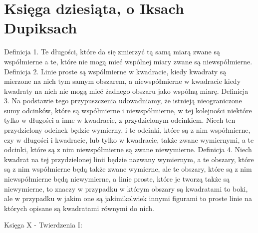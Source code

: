 \section{Księga dziesiąta, o Iksach Dupiksach}

    Definicja 1.
        Te długości, które da się zmierzyć tą samą miarą zwane są współmierne a te, które nie mogą mieć wspólnej miary zwane są niewspółmierne.
    Definicja 2.
        Linie proste są współmierne w kwadracie, kiedy kwadraty są mierzone na nich tym samym obszarem, a niewspółmierne w kwadracie kiedy kwadraty na nich nie mogą mieć żadnego obszaru jako wspólną miarę.
    Definicja 3.
        Na podstawie tego przypuszczenia udowadniamy, że istnieją nieograniczone sumy odcinków, które są współmierne i niewspółmierne, w tej kolejności niektóre tylko w długości a inne w kwadracie, z przydzielonym odcinkiem. Niech ten przydzielony odcinek będzie wymierny, i te odcinki, które są z nim współmierne, czy w długości i kwadracie, lub tylko w kwadracie, także zwane wymiernymi, a te odcinki, które są z nim niewspółmierne są zwane niewymierne.
    Definicja 4.
        Niech kwadrat na tej przydzielonej linii będzie nazwany wymiernym, a te obszary, które są z nim współmierne będą także zwane wymierne, ale te obszary, które są z nim niewspółmierne będą niewymierne, a linie proste, które je tworzą także są niewymierne, to znaczy w przypadku w którym obszary są kwadratami to boki, ale w przypadku w jakim one są jakimikolwiek innymi figurami to proste linie na których opisane są kwadratami równymi do nich.
    
    
    Księga X - Twierdzenia I:
    
